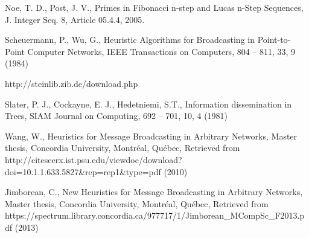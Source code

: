\documentclass[preprint,12pt,review]{elsarticle}
\begin{document}
\begin{thebibliography}{}
Noe, T. D., Post, J. V., 
Primes in Fibonacci n-step and Lucas n-Step Sequences,
J. Integer Seq. 8, Article 05.4.4, 2005.

Scheuermann, P., Wu, G.,
Heuristic Algorithms for Broadcasting in Point-to-Point Computer Networks,
IEEE Transactions on Computers, 804 -- 811, 33, 9 (1984)

http://steinlib.zib.de/download.php

Slater, P. J., Cockayne, E. J., Hedetniemi, S.T.,
Information dissemination in Trees,
SIAM Journal on Computing, 692 -- 701, 10, 4 (1981)

Wang, W.,
Heuristics for Message Broadcasting in Arbitrary Networks,
Master thesis, Concordia University, Montr\'eal, Qu\'ebec, 
Retrieved from http://citeseerx.ist.psu.edu/viewdoc/download?doi=10.1.1.633.5827\&rep=rep1\&type=pdf (2010)

Jimborean, C.,
New Heuristics for Message Broadcasting in Arbitrary Networks,
Master thesis, Concordia University, Montr\'eal, Qu\'ebec, 
Retrieved from https://spectrum.library.concordia.ca/977717/1/Jimborean\_MCompSc\_F2013.pdf (2013)


\end{thebibliography}
\end{document}
